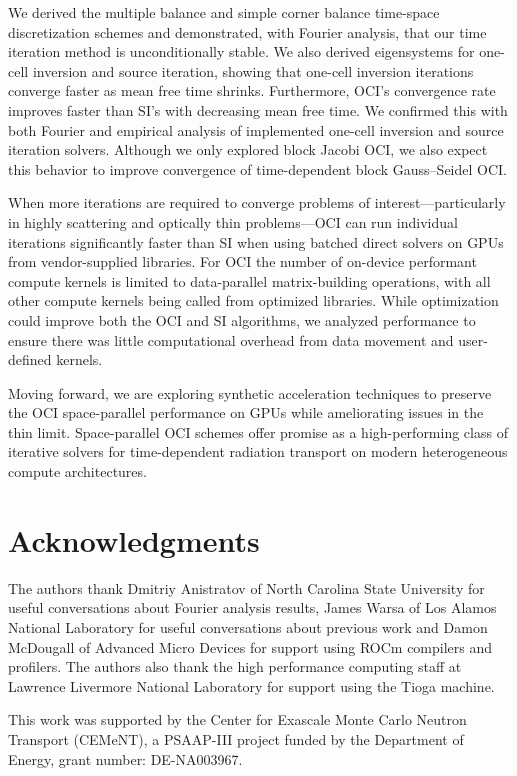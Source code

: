 We derived the multiple balance and simple corner balance time-space discretization schemes and demonstrated, with Fourier analysis, that our time iteration method is unconditionally stable.
We also derived eigensystems for one-cell inversion and source iteration, showing that one-cell inversion iterations converge faster as mean free time shrinks.
Furthermore, OCI's convergence rate improves faster than SI's with decreasing mean free time.
We confirmed this with both Fourier and empirical analysis of implemented one-cell inversion and source iteration solvers.
Although we only explored block Jacobi OCI, we also expect this behavior to improve convergence of time-dependent block Gauss--Seidel OCI.

When more iterations are required to converge problems of interest---particularly in highly scattering and optically thin problems---OCI can run individual iterations significantly faster than SI when using batched direct solvers on GPUs from vendor-supplied libraries.
For OCI the number of on-device performant compute kernels is limited to data-parallel matrix-building operations, with all other compute kernels being called from optimized libraries. 
While optimization could improve both the OCI and SI algorithms, we analyzed performance to ensure there was little computational overhead from data movement and user-defined kernels.

Moving forward, we are exploring synthetic acceleration techniques to preserve the OCI space-parallel performance on GPUs while ameliorating issues in the thin limit.
Space-parallel OCI schemes offer promise as a high-performing class of iterative solvers for time-dependent radiation transport on modern heterogeneous compute architectures.

\section*{Acknowledgments}

The authors thank Dmitriy Anistratov of North Carolina State University for useful conversations about Fourier analysis results, James Warsa of Los Alamos National Laboratory for useful conversations about previous work and Damon McDougall of Advanced Micro Devices for support using ROCm compilers and profilers. 
The authors also thank the high performance computing staff at Lawrence Livermore National Laboratory for support using the Tioga machine.

This work was supported by the Center for Exascale Monte Carlo Neutron Transport (CEMeNT), a PSAAP-III project funded by the Department of Energy, grant number: DE-NA003967.
